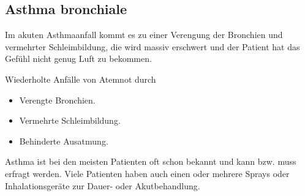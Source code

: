 


\subsection{Asthma bronchiale}
\label{topic:asthma-bronchiale}


{
Im akuten Asthmaanfall kommt es zu einer Verengung der
Bronchien und vermehrter Schleimbildung, die 
wird massiv erschwert und der Patient hat das Gefühl nicht genug Luft zu bekommen.
}{ Wiederholte Anfälle von Atemnot durch

\begin{itemize}
  \item Verengte Bronchien.
  \item Vermehrte Schleimbildung.
  \item Behinderte Ausatmung.
\end{itemize}
}
{}
{}
{}





Asthma ist bei den meisten Patienten oft schon bekannt und
kann bzw. muss erfragt werden. Viele Patienten haben auch
einen oder mehrere Sprays oder Inhalationsgeräte zur Dauer-
oder Akutbehandlung. 

